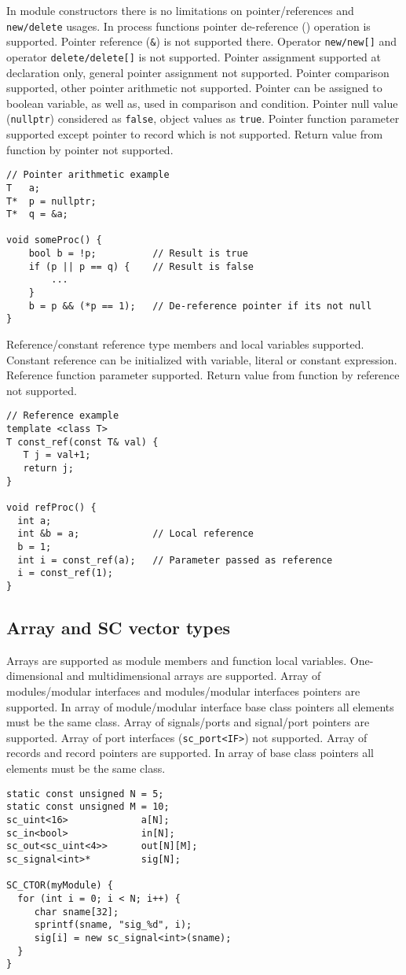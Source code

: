 In module constructors there is no limitations on pointer/references and {\tt new/delete} usages. In process functions pointer de-reference ({\tt *}) operation is supported. Pointer reference ({\tt \&}) is not supported there. Operator {\tt new/new[]} and operator {\tt delete/delete[]} is not supported. Pointer assignment supported at declaration only, general pointer assignment not supported. Pointer comparison supported, other pointer arithmetic not supported. Pointer can be assigned to boolean variable, as well as, used in comparison and condition. Pointer null value ({\tt nullptr}) considered as {\tt false}, object values as {\tt true}.
Pointer function parameter supported except pointer to record which is not supported. Return value from function by pointer not supported.

\begin{lstlisting}[style=mycpp]
// Pointer arithmetic example
T   a;
T*  p = nullptr;
T*  q = &a;

void someProc() {
    bool b = !p;          // Result is true
    if (p || p == q) {    // Result is false
        ...
    }
    b = p && (*p == 1);   // De-reference pointer if its not null
}
\end{lstlisting}

Reference/constant reference type members and local variables supported. Constant reference can be initialized with variable, literal or constant expression. Reference function parameter supported. Return value from function by reference not supported. 
%
\begin{lstlisting}[style=mycpp]
// Reference example
template <class T>
T const_ref(const T& val) {
   T j = val+1;
   return j;
}

void refProc() {
  int a;
  int &b = a;             // Local reference
  b = 1;
  int i = const_ref(a);   // Parameter passed as reference
  i = const_ref(1);
}
\end{lstlisting}


\subsection{Array and SC vector types}

Arrays are supported as module members and function local variables. One-dimensional and multidimensional arrays are supported. Array of modules/modular interfaces and modules/modular interfaces pointers are supported.  In array of module/modular interface base class pointers all elements must be the same class. Array of signals/ports and signal/port pointers are supported. Array of port interfaces ({\tt sc\_port<IF>}) not supported. Array of records and record pointers are supported. In array of base class pointers all elements must be the same class.
%
\begin{lstlisting}[style=mycpp]
static const unsigned N = 5;   
static const unsigned M = 10;   
sc_uint<16>  		    a[N];
sc_in<bool>             in[N];
sc_out<sc_uint<4>>      out[N][M];
sc_signal<int>*     	sig[N];

SC_CTOR(myModule) {
  for (int i = 0; i < N; i++) {
     char sname[32];
     sprintf(sname, "sig_%d", i); 
     sig[i] = new sc_signal<int>(sname);
  }   
}
\end{lstlisting}


